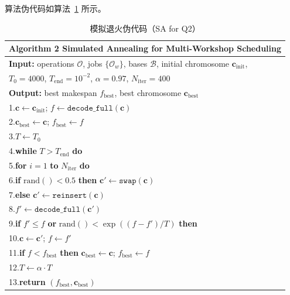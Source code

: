 \documentclass[12pt,a4paper]{ctexart}
\begin{document}
算法伪代码如算法~\ref{alg:sa} 所示。

\begin{table}[H]
\centering
\caption{模拟退火伪代码（SA for Q2）}\label{alg:sa}
\begin{tabular}{p{14cm}}
\toprule
\textbf{Algorithm 2} Simulated Annealing for Multi-Workshop Scheduling \\
\midrule
\textbf{Input:} operations $\mathcal{O}$, jobs $\{\mathcal{O}_w\}$, bases $\mathcal{B}$, initial chromosome $\mathbf{c}_{\mathrm{init}}$, \\
\qquad\;\; $T_0=4000$, $T_{\mathrm{end}}=10^{-2}$, $\alpha=0.97$, $N_{\mathrm{iter}}=400$ \\
\textbf{Output:} best makespan $f_{\mathrm{best}}$, best chromosome $\mathbf{c}_{\mathrm{best}}$ \\
\midrule
1.\quad $\mathbf{c} \leftarrow \mathbf{c}_{\mathrm{init}}$; $f \leftarrow \texttt{decode\_full}(\mathbf{c})$ \\
2.\quad $\mathbf{c}_{\mathrm{best}} \leftarrow \mathbf{c}$; $f_{\mathrm{best}} \leftarrow f$ \\
3.\quad $T \leftarrow T_0$ \\
4.\quad \textbf{while } $T > T_{\mathrm{end}}$ \textbf{do} \\
5.\quad\quad \textbf{for } $i=1$ \textbf{to} $N_{\mathrm{iter}}$ \textbf{do} \\
6.\quad\quad\quad \textbf{if } $\mathrm{rand}() < 0.5$ \textbf{then} $\mathbf{c}' \leftarrow \texttt{swap}(\mathbf{c})$ \\
7.\quad\quad\quad \textbf{else } $\mathbf{c}' \leftarrow \texttt{reinsert}(\mathbf{c})$ \\
8.\quad\quad\quad $f' \leftarrow \texttt{decode\_full}(\mathbf{c}')$ \\
9.\quad\quad\quad \textbf{if } $f' \le f$ \textbf{or } $\mathrm{rand}() < \exp((f-f')/T)$ \textbf{then} \\
10.\quad\quad\quad\quad $\mathbf{c} \leftarrow \mathbf{c}'$; $f \leftarrow f'$ \\
11.\quad\quad\quad\quad \textbf{if } $f < f_{\mathrm{best}}$ \textbf{then} $\mathbf{c}_{\mathrm{best}} \leftarrow \mathbf{c}$; $f_{\mathrm{best}} \leftarrow f$ \\
12.\quad\quad $T \leftarrow \alpha \cdot T$ \\
13.\quad \textbf{return } $(f_{\mathrm{best}}, \mathbf{c}_{\mathrm{best}})$ \\
\bottomrule
\end{tabular}
\end{table}
\end{document}
